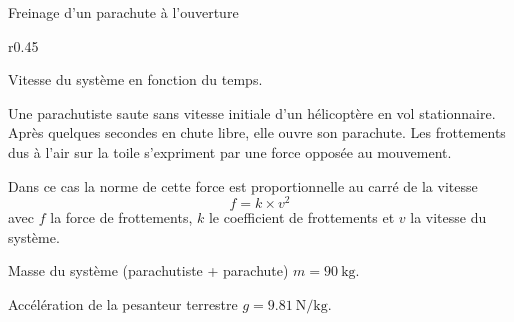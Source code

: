 



\pasCorrection{\newpage}

\begin{doc}{Freinage d'un parachute à l'ouverture}
  \begin{wrapfigure}{r}{0.45\linewidth}
    \vspace*{-24pt}
    \begin{center}
      \small{
        Vitesse du système en fonction du temps.
      }
    \end{center}
  \end{wrapfigure}
  
  Une parachutiste saute sans vitesse initiale d'un hélicoptère en vol stationnaire.
  Après quelques secondes en chute libre, elle ouvre son parachute.
  Les frottements dus à l'air sur la toile s'expriment par une force opposée au mouvement. 
  
  Dans ce cas la norme de cette force est proportionnelle au carré de la vitesse
  \begin{equation*}
    f = k \times v^2
  \end{equation*}
  avec $f$ la force de frottements, $k$ le coefficient de frottements et $v$ la vitesse du système.

  \begin{listePoints}
    \item Masse du système (parachutiste + parachute) $m = \qty{90}{\kg}$.
  \end{listePoints}
  \vAligne{-34pt}
  
  \begin{listePoints}
    \item Accélération de la pesanteur terrestre $g = \qty{9,81}{\newton \per\kg}$.
  \end{listePoints}
\end{doc}

